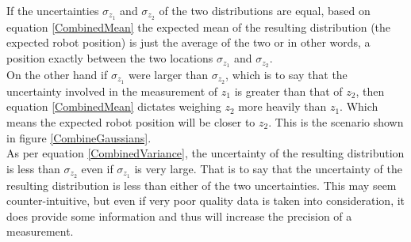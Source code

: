 \documentclass[conference]{IEEEtran}
\begin{document}
If the uncertainties $\sigma_{z_1}$ and $\sigma_{z_2}$ of the two distributions are equal, based on equation \ref{CombinedMean} the expected mean of the resulting distribution (the expected robot position) is just the average of the two or in other words, a position exactly between the two locations $\sigma_{z_1}$ and $\sigma_{z_2}$\cite{maybeck}.\\

On the other hand if $\sigma_{z_1}$ were larger than $\sigma_{z_2}$, which is to say that the uncertainty involved in the measurement of $z_1$ is greater than that of $z_2$, then equation \ref{CombinedMean} dictates weighing $z_2$ more heavily than $z_1$. Which means the expected robot position will be closer to $z_2$. This is the scenario shown in figure \ref{CombineGaussians}.\\

As per equation \ref{CombinedVariance}, the uncertainty of the resulting distribution is less than $\sigma_{z_2}$ even if $\sigma_{z_1}$ is very large. That is to say that the uncertainty of the resulting distribution is less than either of the two uncertainties. This may seem counter-intuitive, but even if very poor quality data is taken into consideration, it does provide some information and thus will increase the precision of a measurement.

\end{document}
